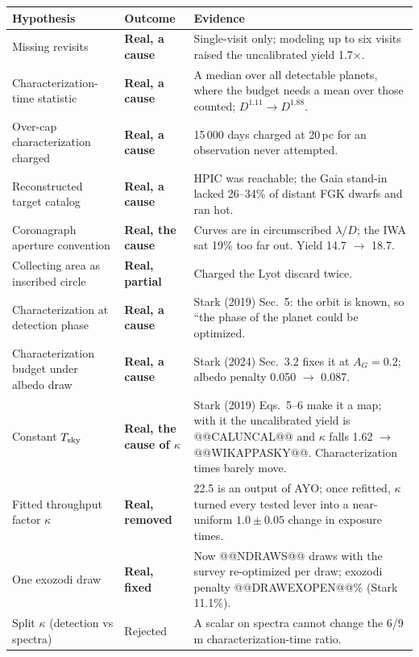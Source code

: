 \documentclass[11pt,a4paper]{article}
\begin{document}
\begin{table}[htbp]
\centering
\scriptsize
\begin{tabular}{p{4.6cm}p{2.6cm}p{8.0cm}}
\toprule
\textbf{Hypothesis} & \textbf{Outcome} & \textbf{Evidence} \\
\midrule
Missing revisits & \textbf{Real, a cause} & Single-visit only; modeling up to six visits raised the uncalibrated yield 1.7$\times$. \\
Characterization-time statistic & \textbf{Real, a cause} & A median over all detectable planets, where the budget needs a mean over those counted; $D^{1.11} \to D^{1.88}$. \\
Over-cap characterization charged & \textbf{Real, a cause} & 15\,000 days charged at 20\,pc for an observation never attempted. \\
Reconstructed target catalog & \textbf{Real, a cause} & HPIC was reachable; the Gaia stand-in lacked 26--34\% of distant FGK dwarfs and ran hot. \\
Coronagraph aperture convention & \textbf{Real, the cause} & Curves are in circumscribed $\lambda/D$; the IWA sat 19\% too far out. Yield 14.7 $\to$ 18.7. \\
Collecting area as inscribed circle & \textbf{Real, partial} & Charged the Lyot discard twice. \\
Characterization at detection phase & \textbf{Real, a cause} & Stark (2019) Sec.~5: the orbit is known, so ``the phase of the planet could be optimized. \\
Characterization budget under albedo draw & \textbf{Real, a cause} & Stark (2024) Sec.~3.2 fixes it at $A_G = 0.2$; albedo penalty 0.050 $\to$ 0.087. \\
Constant $T_{\rm sky}$ & \textbf{Real, the cause of $\kappa$} & Stark (2019) Eqs.~5--6 make it a map; with it the uncalibrated yield is @@CALUNCAL@@ and $\kappa$ falls 1.62 $\to$ @@WIKAPPASKY@@. Characterization times barely move. \\
Fitted throughput factor $\kappa$ & \textbf{Real, removed} & 22.5 is an output of AYO; once refitted, $\kappa$ turned every tested lever into a near-uniform $1.0 \pm 0.05$ change in exposure times. \\
One exozodi draw & \textbf{Real, fixed} & Now @@NDRAWS@@ draws with the survey re-optimized per draw; exozodi penalty @@DRAWEXOPEN@@\% (Stark 11.1\%). \\
Split $\kappa$ (detection vs spectra) & Rejected & A scalar on spectra cannot change the 6/9\,m characterization-time ratio. \\

\end{tabular}
\end{table}
\end{document}
